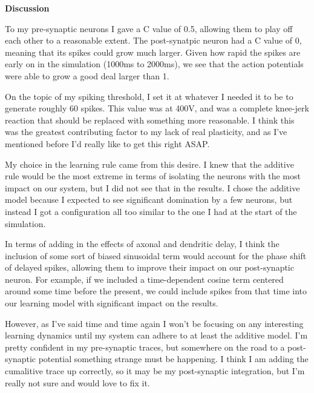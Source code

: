 \documentclass[a4paper,12pt]{article}
\begin{document}
{\bf Discussion}
\bigskip

To my pre-synaptic neurons I gave a C value of 0.5, allowing them to play off each other to a reasonable extent. The post-synatpic neuron had a C value of 0, meaning that its spikes could grow much larger. Given how rapid the spikes are early on in the simulation (1000ms to 2000ms), we see that the action potentials were able to grow a good deal larger than 1. 

\vspace{2mm}

On the topic of my spiking threshold, I set it at whatever I needed it to be to generate roughly 60 spikes. This value was at 400V, and was a complete knee-jerk reaction that should be replaced with something more reasonable. I think this was the greatest contributing factor to my lack of real plasticity, and as I've mentioned before I'd really like to get this right ASAP. 

\vspace{2mm}

My choice in the learning rule came from this desire. I knew that the additive rule would be the most extreme in terms of isolating the neurons with the most impact on our system, but I did not see that in the results. I chose the additive model because I expected to see significant domination by a few neurons, but instead I got a configuration all too similar to the one I had at the start of the simulation. 

\vspace{2mm}

In terms of adding in the effects of axonal and dendritic delay, I think the inclusion of some sort of biased sinusoidal term would account for the phase shift of delayed spikes, allowing them to improve their impact on our post-synaptic neuron. For example, if we included a time-dependent cosine term centered around some time before the present, we could include spikes from that time into our learning model with significant impact on the results. 

\vspace{2mm}

However, as I've said time and time again I won't be focusing on any interesting learning dynamics until my system can adhere to at least the additive model. I'm pretty confident in my pre-synaptic traces, but somewhere on the road to a post-synaptic potential something strange must be happening. I think I am adding the cumalitive trace up correctly, so it may be my post-synaptic integration, but I'm really not sure and would love to fix it. 
\end{document}

